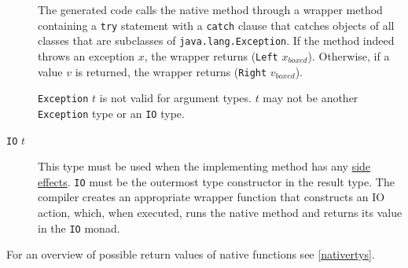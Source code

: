 \begin{description}
The generated code calls the native method through a wrapper method containing a \texttt{try} statement with a \texttt{catch} clause that catches objects of all classes that are subclasses of \texttt{java.lang.Exception}.
If the method indeed throws an exception $x$, the wrapper returns (\texttt{Left} $x_{boxed}$).
Otherwise, if a value $v$ is returned, the wrapper returns (\texttt{Right} $v_{boxed}$).

\texttt{Exception} $t$ is not valid for argument types. $t$ may not be another \texttt{Exception} type or an \texttt{IO} type.

\item[\texttt{IO} $t$] This type must be used when the implementing method has any \hyperref[pure]{side effects}. \texttt{IO} must be the outermost type constructor in the result type. The compiler creates an appropriate wrapper function that constructs an IO action, which, when executed, runs the native method and returns its value in the \texttt{IO} monad.

\end{description}

For an overview of possible return values of native functions see \autoref{nativertys}.

